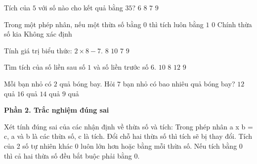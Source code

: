 \begin{ex} %
Tích của $5$ với số nào cho kết quả bằng $35$?
\choice
{$6$}
{$8$}
{\True $7$}
{$9$}
\end{ex}

\begin{ex} %
Trong một phép nhân, nếu một thừa số bằng $0$ thì tích luôn bằng
\choice
{$1$}
{\True $0$}
{Chính thừa số kia}
{Không xác định}
\end{ex}

\begin{ex} %
Tính giá trị biểu thức: $2 \times 8 - 7$.
\choice
{$8$}
{$10$}
{$7$}
{\True $9$}
\end{ex}

\begin{ex} %
Tìm tích của số liền sau số $1$ và số liền trước số $6$.
\choice
{\True $10$}
{$8$}
{$12$}
{$9$}
\end{ex}

\begin{ex} %
Mỗi bạn nhỏ có $2$ quả bóng bay. Hỏi $7$ bạn nhỏ có bao nhiêu quả bóng bay?
\choice
{$12$ quả}
{$16$ quả}
{\True $14$ quả}
{$9$ quả}
\end{ex}

\textbf{Phần 2. Trắc nghiệm đúng sai}

\begin{ex} %
Xét tính đúng sai của các nhận định về thừa số và tích:
\choiceTF
{\True Trong phép nhân a x b = c, a và b là các thừa số, c là tích.}
{Đổi chỗ hai thừa số thì tích sẽ bị thay đổi.}
{\True Tích của 2 số tự nhiên khác 0 luôn lớn hơn hoặc bằng mỗi thừa số.}
{Nếu tích bằng 0 thì cả hai thừa số đều bắt buộc phải bằng 0.}
\end{ex}


